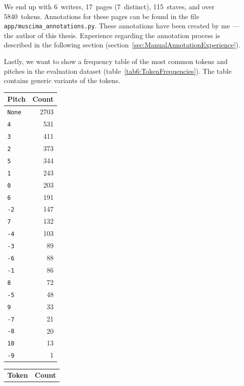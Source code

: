 We end up with 6~writers, 17~pages (7~distinct), 115~staves, and over 5840~tokens. Annotations for these pages can be found in the file \verb`app/`\allowbreak\verb`mus`\allowbreak\verb`ci`\allowbreak\verb`ma_`\allowbreak\verb`annota`\allowbreak\verb`tions.py`. These annotations have been created by me --- the author of this thesis. Experience regarding the annotation process is described in the following section (section~\ref{sec:ManualAnnotationExperience}).

Lastly, we want to show a frequency table of the most common tokens and pitches in the evaluation dataset (table~\ref{tab6:TokenFrequencies}). The table contains generic variants of the tokens.

\begin{table}[p] \centering
    \begin{tabular}{lr}
        \toprule
        \textbf{Pitch} & \textbf{Count} \\
        \midrule
        \verb`None` & 2703 \\
        \verb`4` & 531 \\
        \verb`3` & 411 \\
        \verb`2` & 373 \\
        \verb`5` & 344 \\
        \verb`1` & 243 \\
        \verb`0` & 203 \\
        \verb`6` & 191 \\
        \verb`-2` & 147 \\
        \verb`7` & 132 \\
        \verb`-4` & 103 \\
        \verb`-3` & 89 \\
        \verb`-6` & 88 \\
        \verb`-1` & 86 \\
        \verb`8` & 72 \\
        \verb`-5` & 48 \\
        \verb`9` & 33 \\
        \verb`-7` & 21 \\
        \verb`-8` & 20 \\
        \verb`10` & 13 \\
        \verb`-9` & 1 \\
        \bottomrule
    \end{tabular}
    \qquad\qquad\qquad\qquad
    \begin{tabular}{lr}
        \toprule
        \textbf{Token} & \textbf{Count} \\

\end{tabular}
\end{table}
